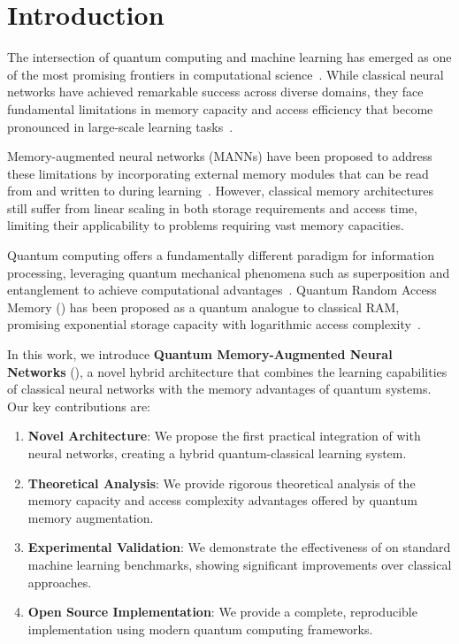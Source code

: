 \section{Introduction}
\label{sec:intro}

The intersection of quantum computing and machine learning has emerged as one of the most promising frontiers in computational science~\cite{biamonte2017quantum, schuld2015introduction}. While classical neural networks have achieved remarkable success across diverse domains, they face fundamental limitations in memory capacity and access efficiency that become pronounced in large-scale learning tasks~\cite{graves2016hybrid, santoro2016meta}. 

Memory-augmented neural networks (MANNs) have been proposed to address these limitations by incorporating external memory modules that can be read from and written to during learning~\cite{graves2014neural, weston2014memory}. However, classical memory architectures still suffer from linear scaling in both storage requirements and access time, limiting their applicability to problems requiring vast memory capacities.

Quantum computing offers a fundamentally different paradigm for information processing, leveraging quantum mechanical phenomena such as superposition and entanglement to achieve computational advantages~\cite{nielsen2010quantum}. Quantum Random Access Memory (\qram) has been proposed as a quantum analogue to classical RAM, promising exponential storage capacity with logarithmic access complexity~\cite{giovannetti2008quantum, park2019circuit}.

In this work, we introduce \textbf{Quantum Memory-Augmented Neural Networks} (\qmann), a novel hybrid architecture that combines the learning capabilities of classical neural networks with the memory advantages of quantum systems. Our key contributions are:

\begin{enumerate}
    \item \textbf{Novel Architecture}: We propose the first practical integration of \qram with neural networks, creating a hybrid quantum-classical learning system.
    
    \item \textbf{Theoretical Analysis}: We provide rigorous theoretical analysis of the memory capacity and access complexity advantages offered by quantum memory augmentation.
    
    \item \textbf{Experimental Validation}: We demonstrate the effectiveness of \qmann on standard machine learning benchmarks, showing significant improvements over classical approaches.
    
    \item \textbf{Open Source Implementation}: We provide a complete, reproducible implementation using modern quantum computing frameworks.
\end{enumerate}

